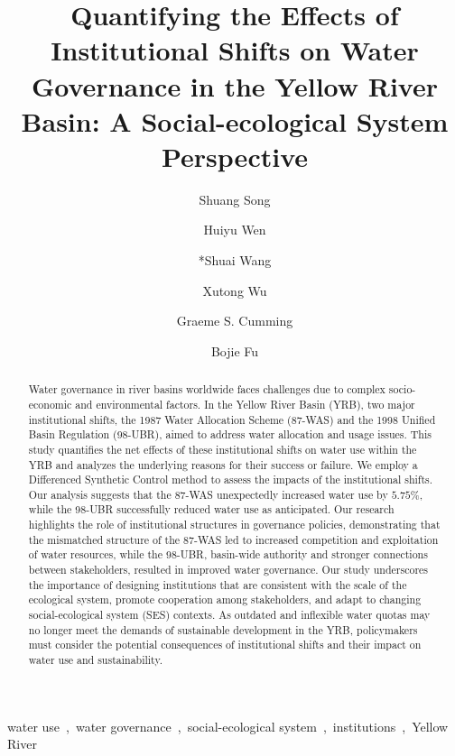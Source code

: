 \documentclass[preprint, 12pt]{elsarticle}
\begin{document}
\begin{frontmatter}

\title{Quantifying the Effects of Institutional Shifts on Water Governance in the Yellow River Basin: A Social-ecological System Perspective}


\author[inst1]{Shuang Song}
\author[inst2]{Huiyu Wen}
\author[inst1]{*Shuai Wang}
\author[inst1]{Xutong Wu}

\author[inst3]{Graeme S. Cumming}
\author[inst1]{Bojie Fu}







\begin{abstract}
     Water governance in river basins worldwide faces challenges due to complex socio-economic and environmental factors. In the Yellow River Basin (YRB), two major institutional shifts, the 1987 Water Allocation Scheme (87-WAS) and the 1998 Unified Basin Regulation (98-UBR), aimed to address water allocation and usage issues. This study quantifies the net effects of these institutional shifts on water use within the YRB and analyzes the underlying reasons for their success or failure.
     We employ a Differenced Synthetic Control method to assess the impacts of the institutional shifts. Our analysis suggests that the 87-WAS unexpectedly increased water use by $5.75\%$, while the 98-UBR successfully reduced water use as anticipated. Our research highlights the role of institutional structures in governance policies, demonstrating that the mismatched structure of the 87-WAS led to increased competition and exploitation of water resources, while the 98-UBR, basin-wide authority and stronger connections between stakeholders, resulted in improved water governance.
     Our study underscores the importance of designing institutions that are consistent with the scale of the ecological system, promote cooperation among stakeholders, and adapt to changing social-ecological system (SES) contexts. As outdated and inflexible water quotas may no longer meet the demands of sustainable development in the YRB, policymakers must consider the potential consequences of institutional shifts and their impact on water use and sustainability.
\end{abstract}



\begin{keyword}
     water use~\sep~water governance~\sep~social-ecological system~\sep~institutions~\sep~Yellow River
\end{keyword}

\end{frontmatter}
\newpage
\linenumbers
\end{document}
